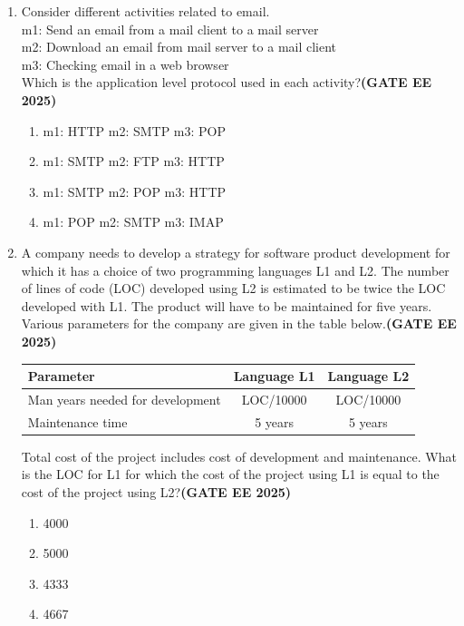 \documentclass[journal,12pt,onecolumn]{IEEEtran}
\theoremstyle{remark}
\begin{document}
\begin{enumerate}
\item Consider different activities related to email.
\\
m1: Send an email from a mail client to a mail server
\\
m2: Download an email from mail server to a mail client
\\
m3: Checking email in a web browser
\\
Which is the application level protocol used in each activity?\hfill \textbf{(GATE EE 2025)}
\begin{enumerate}
    \item m1: HTTP \quad m2: SMTP \quad m3: POP
    \item m1: SMTP \quad m2: FTP \quad m3: HTTP
    \item m1: SMTP \quad m2: POP \quad m3: HTTP
    \item m1: POP \quad m2: SMTP \quad m3: IMAP
\end{enumerate}

\item A company needs to develop a strategy for software product development for which it has a choice of two programming languages L1 and L2. The number of lines of code (LOC) developed using L2 is estimated to be twice the LOC developed with L1. The product will have to be maintained for five years. Various parameters for the company are given in the table below.\hfill \textbf{(GATE EE 2025)}

\begin{center}
\begin{tabular}{|l|c|c|}
\hline
\textbf{Parameter} & \textbf{Language L1} & \textbf{Language L2} \\ \hline
Man years needed for development & LOC/10000 & LOC/10000 \\ \hline

Maintenance time & 5 years & 5 years \\ \hline

\end{tabular}
\end{center}

Total cost of the project includes cost of development and maintenance. What is the LOC for L1 for which the cost of the project using L1 is equal to the cost of the project using L2?\hfill \textbf{(GATE EE 2025)}
\begin{enumerate}
    \item 4000
    \item 5000
    \item 4333
    \item 4667
\end{enumerate}


\end{enumerate}
\end{document}
